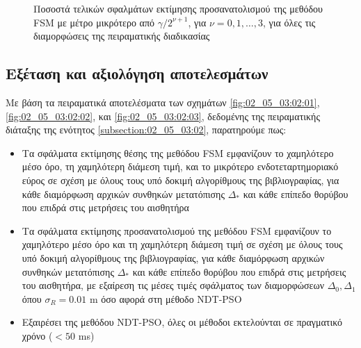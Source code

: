 \begin{figure}\centering\vspace{1cm}
  
  \vspace{-1.5cm}
  \caption{\small Ποσοστά τελικών σφαλμάτων εκτίμησης προσανατολισμού της
           μεθόδου FSM με μέτρο μικρότερο από $\gamma/2^{\nu+1}$, για
           $\nu = 0, 1, \dots, 3$, για όλες τις διαμορφώσεις της πειραματικής
           διαδικασίας}
  \label{fig:02_05_03:02:09}
\end{figure}

\subsection{Εξέταση και αξιολόγηση αποτελεσμάτων}
\label{subsection:02_05_03:03}

Με βάση τα πειραματικά αποτελέσματα των σχημάτων \ref{fig:02_05_03:02:01},
\ref{fig:02_05_03:02:02}, και \ref{fig:02_05_03:02:03}, δεδομένης της
πειραματικής διάταξης της ενότητος \ref{subsection:02_05_03:02}, παρατηρούμε
πως:

\begin{itemize}
  \item Τα σφάλματα εκτίμησης θέσης της μεθόδου FSM εμφανίζουν το χαμηλότερο
        μέσο όρο, τη χαμηλότερη διάμεση τιμή, και το μικρότερο
        ενδοτεταρτημοριακό εύρος σε σχέση με όλους τους υπό δοκιμή αλγορίθμους
        της βιβλιογραφίας, για κάθε διαμόρφωση αρχικών συνθηκών μετατόπισης
        $\Delta_\ast$ και κάθε επίπεδο θορύβου που επιδρά στις μετρήσεις του
        αισθητήρα
  \item Τα σφάλματα εκτίμησης προσανατολισμού της μεθόδου FSM εμφανίζουν το
        χαμηλότερο μέσο όρο και τη χαμηλότερη διάμεση τιμή σε σχέση με όλους
        τους υπό δοκιμή αλγορίθμους της βιβλιογραφίας, για κάθε διαμόρφωση
        αρχικών συνθηκών μετατόπισης $\Delta_\ast$ και κάθε επίπεδο θορύβου που
        επιδρά στις μετρήσεις του αισθητήρα, με εξαίρεση τις μέσες τιμές
        σφάλματος των διαμορφώσεων $\Delta_0,\Delta_1$ όπου $\sigma_R = 0.01$ m
        όσο αφορά στη μέθοδο NDT-PSO
  \item Εξαιρέσει της μεθόδου NDT-PSO, όλες οι μέθοδοι εκτελούνται σε πραγματικό
        χρόνο ($< 50$ ms)
\end{itemize}

